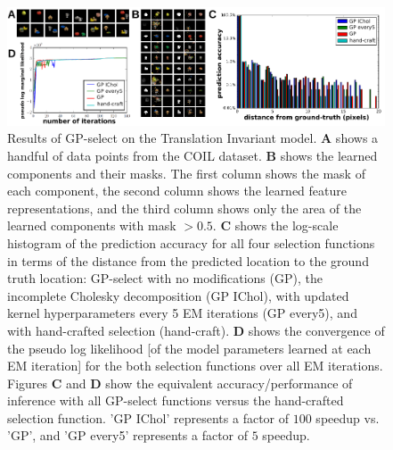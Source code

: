 \begin{figure}[ht]%
\centering
\includegraphics[width=\textwidth]{figs/inveca/invec_mod.pdf}
\caption{Results of GP-select on the Translation Invariant model.
\textbf{A} shows a handful of data points from the COIL dataset.
\textbf{B} shows the learned components and their masks. The first column shows the mask of each component, the second column shows the learned feature representations, and the third column shows only the area of the learned components with mask $>0.5$.
\textbf{C} shows the log-scale histogram of the prediction accuracy for all four selection functions in terms of the distance from the predicted location to the ground truth location: GP-select with no modifications (GP), the incomplete Cholesky decomposition (GP IChol), with updated kernel hyperparameters every 5 EM iterations (GP every5), and with hand-crafted selection (hand-craft).
\textbf{D} shows the convergence of the pseudo log likelihood [of the model parameters learned at each EM iteration] for the both selection functions over all EM iterations. 
Figures \textbf{C} and \textbf{D} show the equivalent accuracy/performance of inference with all GP-select functions versus the hand-crafted selection function.
'GP IChol' represents a factor of $100$ speedup vs. 'GP', and 'GP every5' represents a factor of $5$ speedup.
}
\label{fig:inveca}
\end{figure}

